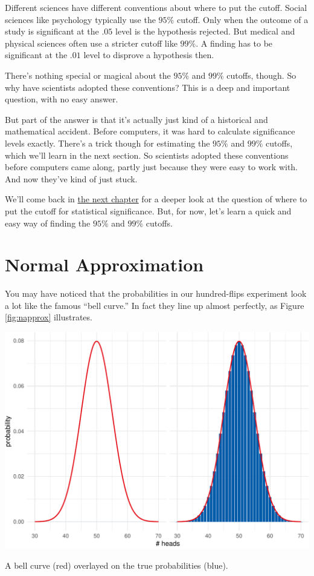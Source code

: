 \documentclass[justified]{tufte-book}
\theoremstyle{definition}
\theoremstyle{definition}
\theoremstyle{definition}
\theoremstyle{definition}
\theoremstyle{remark}
\begin{document}
Different sciences have different conventions about where to put the cutoff. Social sciences like psychology typically use the \(95\%\) cutoff. Only when the outcome of a study is significant at the \(.05\) level is the hypothesis rejected. But medical and physical sciences often use a stricter cutoff like \(99\%\). A finding has to be significant at the \(.01\) level to disprove a hypothesis then.

There's nothing special or magical about the \(95\%\) and \(99\%\) cutoffs, though. So why have scientists adopted these conventions? This is a deep and important question, with no easy answer.

But part of the answer is that it's actually just kind of a historical and mathematical accident. Before computers, it was hard to calculate significance levels exactly. There's a trick though for estimating the \(95\%\) and \(99\%\) cutoffs, which we'll learn in the next section. So scientists adopted these conventions before computers came along, partly just because they were easy to work with. And now they've kind of just stuck.

We'll come back in \protect\hyperlink{chlindley}{the next chapter} for a deeper look at the question of where to put the cutoff for statistical significance. But, for now, let's learn a quick and easy way of finding the \(95\%\) and \(99\%\) cutoffs.

\hypertarget{normal-approximation}{%
\section{Normal Approximation}\label{normal-approximation}}

You may have noticed that the probabilities in our hundred-flips experiment look a lot like the famous ``bell curve.'' In fact they line up almost perfectly, as Figure \ref{fig:napprox} illustrates.

\begin{marginfigure}
\includegraphics{_main_files/figure-latex/napprox-1} \caption[A bell curve (red) overlayed on the true probabilities (blue)]{A bell curve (red) overlayed on the true probabilities (blue).}\label{fig:napprox}
\end{marginfigure}
\end{document}
